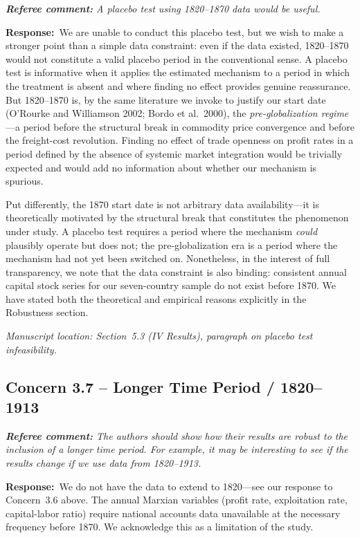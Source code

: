 \documentclass[11pt]{article}
\newcommand{\RC}[1]{\begin{refereebox}\textit{\textbf{Referee comment:} #1}\end{refereebox}}
\newcommand{\AR}{\noindent\textbf{Response:}\ }
\begin{document}
\RC{A placebo test using 1820--1870 data would be useful.}

\AR We are unable to conduct this placebo test, but we wish to make a stronger point than a simple data constraint: even if the data existed, 1820--1870 would not constitute a valid placebo period in the conventional sense. A placebo test is informative when it applies the estimated mechanism to a period in which the treatment is absent and where finding no effect provides genuine reassurance. But 1820--1870 is, by the same literature we invoke to justify our start date (O'Rourke and Williamson 2002; Bordo et al.\ 2000), the \emph{pre-globalization regime}---a period before the structural break in commodity price convergence and before the freight-cost revolution. Finding no effect of trade openness on profit rates in a period defined by the absence of systemic market integration would be trivially expected and would add no information about whether our mechanism is spurious.

Put differently, the 1870 start date is not arbitrary data availability---it is theoretically motivated by the structural break that constitutes the phenomenon under study. A placebo test requires a period where the mechanism \emph{could} plausibly operate but does not; the pre-globalization era is a period where the mechanism had not yet been switched on. Nonetheless, in the interest of full transparency, we note that the data constraint is also binding: consistent annual capital stock series for our seven-country sample do not exist before 1870. We have stated both the theoretical and empirical reasons explicitly in the Robustness section.

\smallskip\noindent\textit{Manuscript location: Section~5.3 (IV Results), paragraph on placebo test infeasibility.}

\subsection*{Concern 3.7 -- Longer Time Period / 1820--1913}

\RC{The authors should show how their results are robust to the inclusion of a longer time period. For example, it may be interesting to see if the results change if we use data from 1820--1913.}

\AR We do not have the data to extend to 1820---see our response to Concern~3.6 above. The annual Marxian variables (profit rate, exploitation rate, capital-labor ratio) require national accounts data unavailable at the necessary frequency before 1870. We acknowledge this as a limitation of the study.
\end{document}
